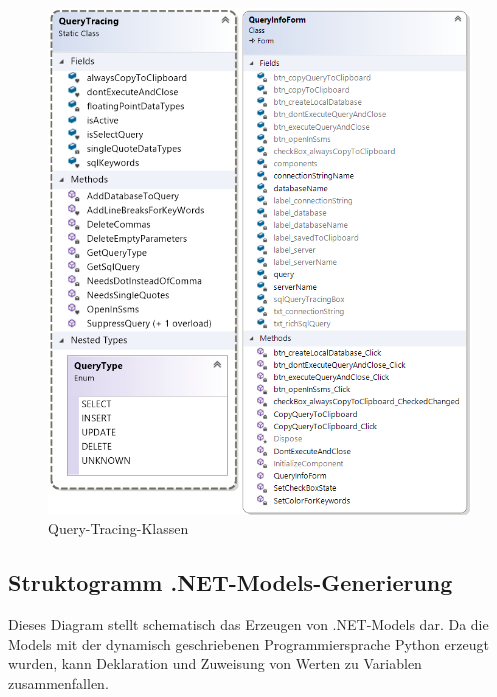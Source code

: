 \documentclass[11pt,toc=sectionentrywithoutdots, 
headheight=44pt, headings=optiontoheadandtoc, hyperfootnotes=false, hypertexnames=false]{scrartcl}
\begin{document}
 \begin{figure}[htp]
 \centering

	\includegraphics[scale=0.8]{queryTracingClass.png}
	 \caption{Query-Tracing-Klassen}
 \end{figure}
 \clearpage
 

\subsection{Struktogramm .NET-Models-Generierung}
Dieses Diagram stellt schematisch das Erzeugen von .NET-Models dar. Da die Models mit der dynamisch geschriebenen Programmiersprache Python erzeugt wurden, kann Deklaration und Zuweisung von Werten zu Variablen zusammenfallen.
 \label{fig:Struktogramm .NET-Models erzeugen}
\end{document}
